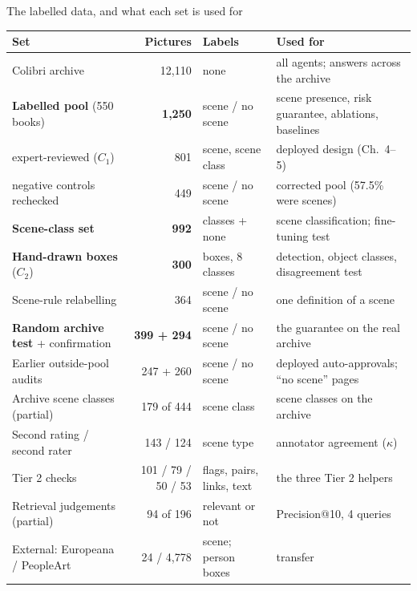 \documentclass[aspectratio=169,10pt]{beamer}
\begin{document}
\begin{frame}{The labelled data, and what each set is used for}
\scriptsize
\renewcommand{\arraystretch}{1.07}
\begin{tabularx}{\textwidth}{@{}>{\raggedright\arraybackslash}p{3.9cm} r >{\raggedright\arraybackslash}p{2.6cm} >{\raggedright\arraybackslash}X@{}}
\toprule
\textbf{Set} & \textbf{Pictures} & \textbf{Labels} & \textbf{Used for}\\
\midrule
Colibri archive & 12,110 & none & all agents; answers across the archive\\
\rowcolor{soft}\textbf{Labelled pool} (550 books) & \textbf{1,250} & scene / no scene & scene presence, risk guarantee, ablations, baselines\\
\quad expert-reviewed ($C_1$) & 801 & scene, scene class & deployed design (Ch.~4--5)\\
\quad negative controls rechecked & 449 & scene / no scene & corrected pool (57.5\% were scenes)\\
\rowcolor{soft}\textbf{Scene-class set} & \textbf{992} & 5 classes + none & scene classification; fine-tuning test\\
\rowcolor{soft}\textbf{Hand-drawn boxes} ($C_2$) & \textbf{300} & boxes, 8 classes & detection, object classes, disagreement test\\
Scene-rule relabelling & 364 & scene / no scene & one definition of a scene\\
\rowcolor{soft}\textbf{Random archive test} + confirmation & \textbf{399 + 294} & scene / no scene & the guarantee on the real archive\\
Earlier outside-pool audits & 247 + 260 & scene / no scene & deployed auto-approvals; ``no scene'' pages\\
Archive scene classes (partial) & 179 of 444 & scene class & scene classes on the archive\\
Second rating / second rater & 143 / 124 & scene type & annotator agreement ($\kappa$)\\
Tier 2 checks & 101 / 79 / 50 / 53 & flags, pairs, links, text & the three Tier 2 helpers\\
Retrieval judgements (partial) & 94 of 196 & relevant or not & Precision@10, 4 queries\\
External: Europeana / PeopleArt & 24 / 4,778 & scene; person boxes & transfer\\
\bottomrule
\end{tabularx}\par\vspace{2pt}

\end{frame}
\end{document}
